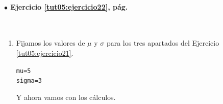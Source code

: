 \documentclass[10pt,a4paper]{article}\usepackage[]{graphicx}\usepackage[]{color}
\makeatletter
\newcommand{\hlnum}[1]{\textcolor[rgb]{0.686,0.059,0.569}{#1}}%
\newcommand{\hlstd}[1]{\textcolor[rgb]{0.345,0.345,0.345}{#1}}%
\newcommand{\hlkwb}[1]{\textcolor[rgb]{0.69,0.353,0.396}{#1}}%
\newenvironment{kframe}{%
 \def\at@end@of@kframe{}%
 \ifinner\ifhmode%
  \def\at@end@of@kframe{\end{minipage}}%
  \begin{minipage}{\columnwidth}%
 \fi\fi%
 \def\FrameCommand##1{\hskip\@totalleftmargin \hskip-\fboxsep
 \colorbox{shadecolor}{##1}\hskip-\fboxsep
     \hskip-\linewidth \hskip-\@totalleftmargin \hskip\columnwidth}%
 \MakeFramed {\advance\hsize-\width
   \@totalleftmargin\z@ \linewidth\hsize
   \@setminipage}}%
 {\par\unskip\endMakeFramed%
 \at@end@of@kframe}
\newenvironment{knitrout}{}{} %
\makeatother
\begin{document}
\paragraph{\bf $\bullet$ Ejercicio \ref{tut05:ejercicio22}, pág. \pageref{tut05:ejercicio22}}
\label{tut05:ejercicio22:sol}\quad\\

\begin{enumerate}
  \item Fijamos los valores de $\mu$ y $\sigma$ para los tres apartados del Ejercicio \ref{tut05:ejercicio21}.
\begin{knitrout}
\color{fgcolor}\begin{kframe}
\begin{alltt}
    \hlstd{mu} \hlkwb{=} \hlnum{5}
    \hlstd{sigma} \hlkwb{=} \hlnum{3}
\end{alltt}
\end{kframe}
\end{knitrout}

        Y ahora vamos con los cálculos.
        \begin{enumerate}


\end{enumerate}
\end{enumerate}
\end{document}
